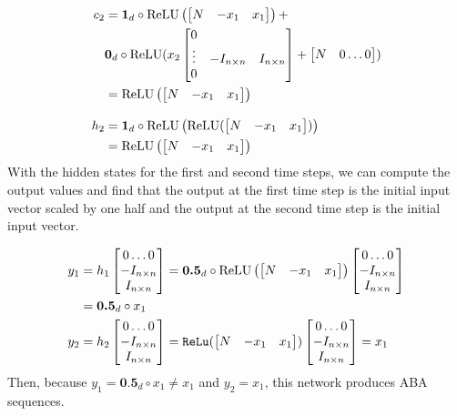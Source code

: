 \begin{align*}
  c_2 &= \textbf{1}_d \circ \operatorname{ReLU} \left( \begin{bmatrix} N & -x_1 & x_1 \end{bmatrix}\right) +\\
      & \textbf{0}_d\circ \operatorname{ReLU}(x_2\begin{bmatrix} 0 &  & \\ \vdots & -I_{n \times n} & I_{n \times n}\\ 0 & &  \end{bmatrix} + \begin{bmatrix} N & 0 \dots 0\end{bmatrix}) \\
      &= \operatorname{ReLU} \left( \begin{bmatrix} N & -x_1 & x_1 \end{bmatrix}\right) \\[2ex]
  h_2 &= \textbf{1}_d \circ \operatorname{ReLU}\left(\operatorname{ReLU} ( \begin{bmatrix} N & -x_1 & x_1 \end{bmatrix})\right) \\
      &= \operatorname{ReLU} \left( \begin{bmatrix} N & -x_1 & x_1 \end{bmatrix}\right)
\end{align*}
%
With the hidden states for the first and second time steps, we can compute the output values and find that the output at the first time step is the initial input vector scaled by one half and the output at the second time step is the initial input vector.

\begin{align*}
  y_1 &= h_1\begin{bmatrix} 0 \dots 0 \\ -I_{n \times n} \\ I_{n \times n}  \end{bmatrix} = \textbf{0.5}_d\circ \operatorname{ReLU}\left( \begin{bmatrix} N & -x_1 & x_1 \end{bmatrix}\right) \begin{bmatrix} 0 \dots 0 \\ -I_{n \times n} \\ I_{n \times n}  \end{bmatrix} \\
      &= \textbf{0.5}_d\circ x_1\\
  y_2 &= h_2\begin{bmatrix} 0 \dots 0 \\ -I_{n \times n} \\ I_{n \times n}  \end{bmatrix} = \texttt{ReLu} ( \begin{bmatrix} N & -x_1 & x_1 \end{bmatrix}) \begin{bmatrix} 0 \dots 0 \\ -I_{n \times n} \\ I_{n \times n}  \end{bmatrix} = x_1
\end{align*}
%
Then, because $y_1 = \textbf{0.5}_d\circ x_1 \not = x_1$ and $y_2 = x_1$, this network produces ABA sequences.


